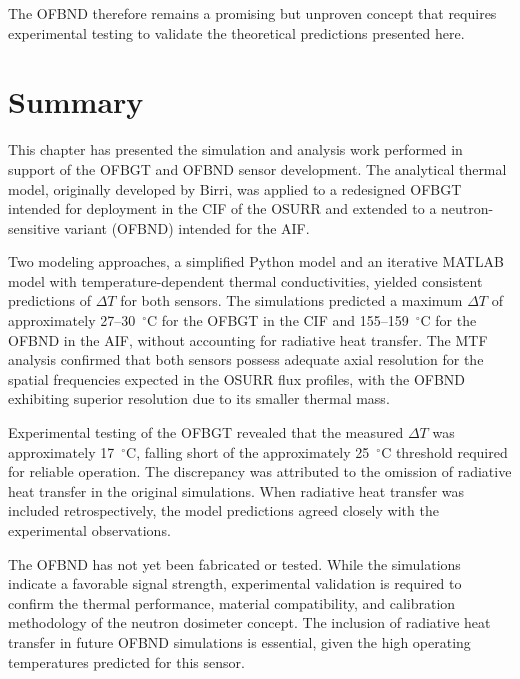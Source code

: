 The OFBND therefore remains a promising but unproven concept that requires experimental testing to validate the theoretical predictions presented here.

\section{Summary}

This chapter has presented the simulation and analysis work performed in support of the OFBGT and OFBND sensor development.  The analytical thermal model, originally developed by Birri, was applied to a redesigned OFBGT intended for deployment in the CIF of the OSURR and extended to a neutron-sensitive variant (OFBND) intended for the AIF.

Two modeling approaches, a simplified Python model and an iterative MATLAB model with temperature-dependent thermal conductivities, yielded consistent predictions of $\Delta T$ for both sensors.  The simulations predicted a maximum $\Delta T$ of approximately 27--30~$^\circ$C for the OFBGT in the CIF and 155--159~$^\circ$C for the OFBND in the AIF, without accounting for radiative heat transfer.  The MTF analysis confirmed that both sensors possess adequate axial resolution for the spatial frequencies expected in the OSURR flux profiles, with the OFBND exhibiting superior resolution due to its smaller thermal mass.

Experimental testing of the OFBGT revealed that the measured $\Delta T$ was approximately 17~$^\circ$C, falling short of the approximately 25~$^\circ$C threshold required for reliable operation.  The discrepancy was attributed to the omission of radiative heat transfer in the original simulations.  When radiative heat transfer was included retrospectively, the model predictions agreed closely with the experimental observations.

The OFBND has not yet been fabricated or tested.  While the simulations indicate a favorable signal strength, experimental validation is required to confirm the thermal performance, material compatibility, and calibration methodology of the neutron dosimeter concept.  The inclusion of radiative heat transfer in future OFBND simulations is essential, given the high operating temperatures predicted for this sensor.